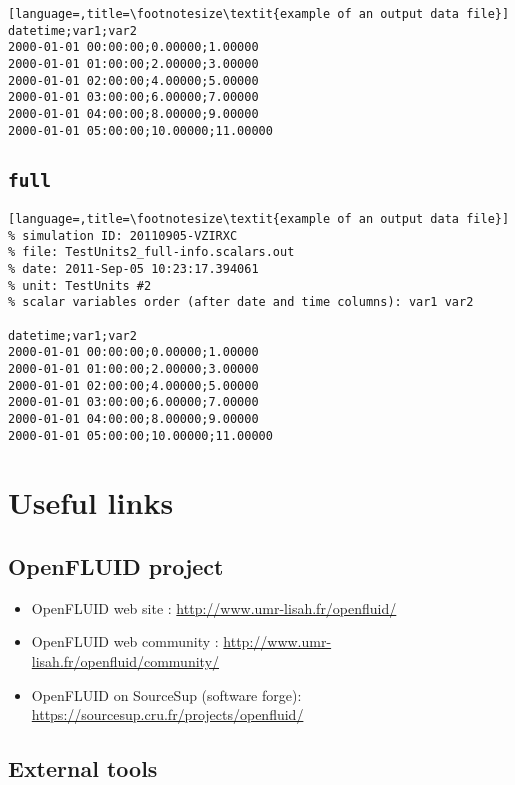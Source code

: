 \begin{lstlisting}[language=,title=\footnotesize\textit{example of an output data file}]
datetime;var1;var2
2000-01-01 00:00:00;0.00000;1.00000 
2000-01-01 01:00:00;2.00000;3.00000
2000-01-01 02:00:00;4.00000;5.00000
2000-01-01 03:00:00;6.00000;7.00000
2000-01-01 04:00:00;8.00000;9.00000
2000-01-01 05:00:00;10.00000;11.00000
\end{lstlisting}

\subsection{\texttt{full}}

\begin{lstlisting}[language=,title=\footnotesize\textit{example of an output data file}]
% simulation ID: 20110905-VZIRXC
% file: TestUnits2_full-info.scalars.out
% date: 2011-Sep-05 10:23:17.394061
% unit: TestUnits #2
% scalar variables order (after date and time columns): var1 var2

datetime;var1;var2
2000-01-01 00:00:00;0.00000;1.00000 
2000-01-01 01:00:00;2.00000;3.00000
2000-01-01 02:00:00;4.00000;5.00000
2000-01-01 03:00:00;6.00000;7.00000
2000-01-01 04:00:00;8.00000;9.00000
2000-01-01 05:00:00;10.00000;11.00000
\end{lstlisting}


\medskip

\section{Useful links}

\subsection{OpenFLUID project}

\begin{itemize}
  \item OpenFLUID web site : \textcolor{blue}{\url{http://www.umr-lisah.fr/openfluid/}}  
  \item OpenFLUID web community : \textcolor{blue}{\url{http://www.umr-lisah.fr/openfluid/community/}}
  \item OpenFLUID on SourceSup (software forge): \textcolor{blue}{\url{https://sourcesup.cru.fr/projects/openfluid/}} 
\end{itemize}


\subsection{External tools}

